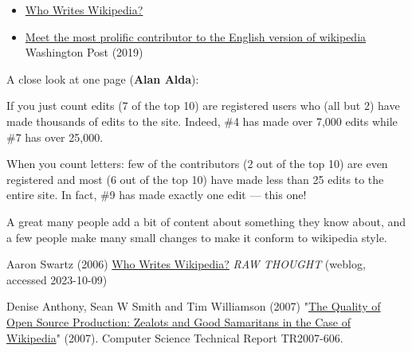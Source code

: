 \documentclass[a4paper,landscape,headrule,footrule,xetex]{foils}
\begin{document}

\begin{itemize}
\item
  \href{https://en.wikipedia.org/wiki/Wikipedia:Who_writes_Wikipedia?}{Who
  Writes Wikipedia?}
\item 
\href{https://www.washingtonpost.com/lifestyle/magazine/meet-the-most-prolific-contributor-to-the-english-version-of-wikipedia/2018/10/02/a6497a74-9411-11e8-a679-b09212fb69c2_story.html?utm_term=.18bfc6ecda09}{Meet
  the most prolific contributor to the English version of wikipedia}
Washington Post (2019)
\end{itemize}



A close look at one page (\textbf{Alan Alda}):

If you just count edits (7 of the top 10) are registered users who
(all but 2) have made thousands of edits to the site. Indeed, \#4 has
made over 7,000 edits while \#7 has over 25,000.

When you count letters: few of the contributors (2 out of the top 10)
are even registered and most (6 out of the top 10) have made less than
25 edits to the entire site. In fact, \#9 has made exactly one edit —
this one!

A great many people add a bit of content about something they know
about, and a few people make many small changes to make it conform to
wikipedia style.



Aaron Swartz (2006) \href{http://www.aaronsw.com/weblog/whowriteswikipedia}{Who Writes Wikipedia?} 
\textit{RAW THOUGHT} (weblog, accessed 2023-10-09)


Denise Anthony, Sean W Smith and Tim Williamson (2007) "\href{https://digitalcommons.dartmouth.edu/cs_tr/306}{The Quality of Open Source Production: Zealots and Good Samaritans in the Case of Wikipedia}" (2007). Computer Science Technical Report TR2007-606. 

\end{document}
